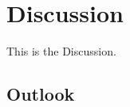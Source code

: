 
\section{Discussion}
\label{sec:discussion}
This is the Discussion.

\subsection{Outlook}
\label{subsec:outlook}
